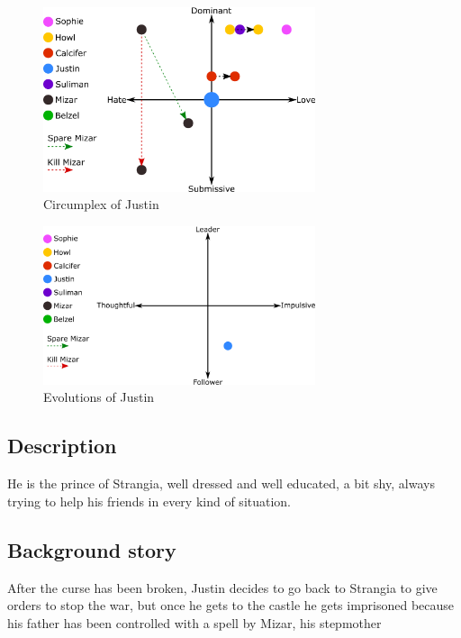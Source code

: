 \begin{figure}
  \centering
  \includegraphics[width=8cm]{Images/Circumplexes/justinCircumplex}
  \caption{Circumplex of Justin}
\end{figure}

\begin{figure}
  \centering
   \includegraphics[width=8cm]{Images/Evolutions/justinEvolution}
  \caption{Evolutions of Justin}
\end{figure}

\subsection{Description}
He is the prince of Strangia, well dressed and well educated, a bit shy, always trying to help his friends in every kind of situation.

\subsection{Background story}
 After the curse has been broken, Justin decides to go back to Strangia to give orders to stop the war, but once he gets to the castle he gets imprisoned because his father has been controlled with a spell by Mizar, his stepmother



